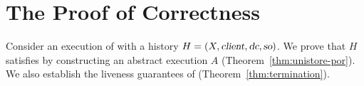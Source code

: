 
\section{The Proof of \unistore{} Correctness} \label{section:correctness-proof}

Consider an execution of \unistore{} with a history $H = (X, \textsl{client}, \textsl{dc}, \textsl{so})$.
We prove that $H$ satisfies \por{}
by constructing an abstract execution $A$ (Theorem~\ref{thm:unistore-por}).
We also establish the liveness guarantees of \unistore{} (Theorem~\ref{thm:termination}).












